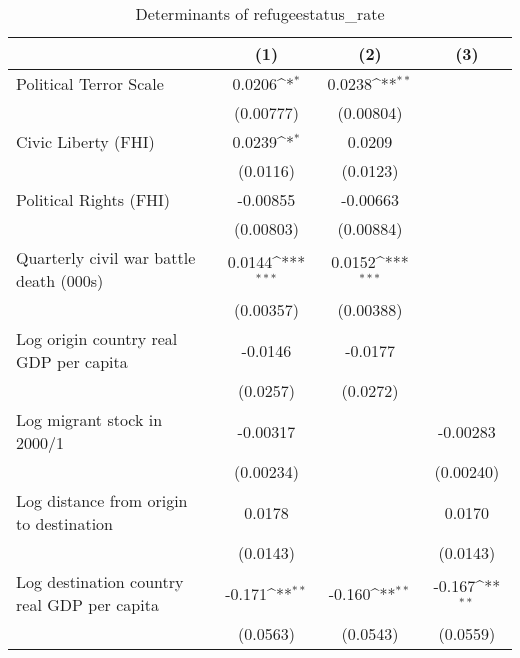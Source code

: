 \begin{table}[htbp]\centering
\def\sym#1{\ifmmode^{#1}\else\(^{#1}\)\fi}
\caption{Determinants of refugeestatus\_rate}
\begin{tabular}{l*{3}{c}}
\hline\hline
                    &\multicolumn{1}{c}{(1)}         &\multicolumn{1}{c}{(2)}         &\multicolumn{1}{c}{(3)}         \\
\hline
Political Terror Scale&      0.0206\sym{*}  &      0.0238\sym{**} &                     \\
                    &   (0.00777)         &   (0.00804)         &                     \\
[1em]
Civic Liberty (FHI) &      0.0239\sym{*}  &      0.0209         &                     \\
                    &    (0.0116)         &    (0.0123)         &                     \\
[1em]
Political Rights (FHI)&    -0.00855         &    -0.00663         &                     \\
                    &   (0.00803)         &   (0.00884)         &                     \\
[1em]
Quarterly civil war battle death (000s)&      0.0144\sym{***}&      0.0152\sym{***}&                     \\
                    &   (0.00357)         &   (0.00388)         &                     \\
[1em]
Log origin country real GDP per capita&     -0.0146         &     -0.0177         &                     \\
                    &    (0.0257)         &    (0.0272)         &                     \\
[1em]
Log migrant stock in 2000/1&    -0.00317         &                     &    -0.00283         \\
                    &   (0.00234)         &                     &   (0.00240)         \\
[1em]
Log distance from origin to destination&      0.0178         &                     &      0.0170         \\
                    &    (0.0143)         &                     &    (0.0143)         \\
[1em]
Log destination country real GDP per capita&      -0.171\sym{**} &      -0.160\sym{**} &      -0.167\sym{**} \\
                    &    (0.0563)         &    (0.0543)         &    (0.0559)         \\

\end{tabular}
\end{table}
